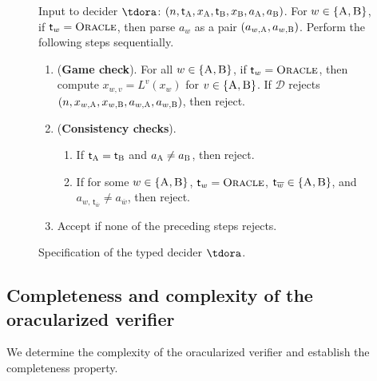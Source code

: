 \documentclass[11pt]{article}
\theoremstyle{definition}
\newcommand{\decider}{\mathcal{D}}
\newcommand{\labelstyle}[1]{\ensuremath{\textsc{#1}}\xspace}
\newcommand{\tvarstyle}[1]{\mathsf{#1}}
\newcommand{\tvar}{\ensuremath{\tvarstyle{t}}}
\newcommand{\alice}{\labelstyle{A}}
\newcommand{\bob}{\labelstyle{B}}
\newcommand{\oracle}{\labelstyle{Oracle}}
\newenvironment{gamespec}{
  \begin{mdframed}[style=figstyle]}{
  \end{mdframed}}
\begin{document}
\begin{figure}[!htb]
  \centering
  \begin{gamespec}
    Input to decider $\tdora$: $(n, \tvar_\alice, x_\alice , \tvar_\bob,
    x_\bob ,a_\alice, a_\bob)$.
    For $w \in \{\alice,\bob\}$, if $\tvar_w = \oracle$, then parse $a_w$ as a
    pair $(a_{w, \alice}, a_{w, \bob})$.
    Perform the following steps sequentially.

    \begin{enumerate}
    \item (\textbf{Game check}).
      \label{enu:oracle-game}
      For all $w \in \{\alice,\bob\}$, if $\tvar_w = \oracle$, then compute
      $x_{w,v} = L^v(x_w)$ for $v \in \{\alice,\bob\}$.
      If $\decider$ rejects $(n,
      x_{w,\alice},x_{w,\bob},a_{w,\alice},a_{w,\bob})$, then reject.

    \item (\textbf{Consistency checks}).
      \label{enu:oracle-full-consistency}
      \begin{enumerate}[nosep]
      \item \label{enu:check-same} If $\tvar_\alice = \tvar_\bob$ and $a_\alice
        \neq a_\bob$, then reject.
      \item \label{enu:oracle-versus-player} If for some $w \in
        \{\alice,\bob\}$, $\tvar_w = \oracle$, $\tvar_{\overline{w}} \in
        \{\alice,\bob\}$, and $a_{w,\, \tvar_{\overline{w}}} \neq
        a_{\overline{w}}$, then reject.
      \end{enumerate}
    \item \label{enu:oracle-acc} Accept if none of the preceding steps rejects.
    \end{enumerate}
  \end{gamespec}
  \caption{Specification of the typed decider $\tdora$.}
  \label{fig:oracle-decider}
\end{figure}

\subsection{Completeness and complexity of the oracularized verifier}

We determine the complexity of the oracularized verifier and
establish the completeness property.
\end{document}
